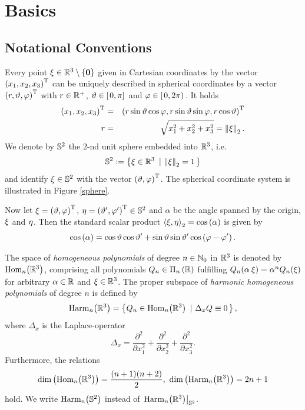 \chapter{Basics}
\label{Basics}

\section{Notational Conventions}
\label{Basics:Notation}

Every point $\mathbf{\xi} \in \mathbb{R}^3 \setminus \left\{\mathbf{0}\right\rbrace$ given in Cartesian coordinates by the vector 
$\left(x_1,x_2,x_3\right)^{\text{\rm{T}}}$ can be uniquely described in spherical coordinates by a vector
$\left(r,\vartheta,\varphi\right)^{\text{\rm{T}}}$ with $r \in \mathbb{R}^{+}$, $\vartheta \in \left[\left.0,\pi\right]\right.$ and 
$\varphi \in \left[\left.0,2\pi\right)\right.$.
It holds 
\begin{eqnarray*}
  \left(x_1,x_2,x_3\right)^{\text{\rm{T}}} & = & \left(r \sin \vartheta \cos \varphi, r \sin \vartheta \sin \varphi, r \cos \vartheta\right)^{\text{\rm{T}}}\\
  r & = & \sqrt{x_1^2+x_2^2+x_3^2} = \left\|\mathbf{\xi}\right\|_2.
\end{eqnarray*} 
We denote by $\mathbb{S}^2$ the $2$-nd unit sphere embedded into $\mathbb{R}^3$, i.e. 
$$\mathbb{S}^2 := \left\{\mathbf{\xi} \in \mathbb{R}^{3}\ \left|\ \left\|\mathbf{\xi}\right\|_2=1\right.\right\rbrace$$ 
and identify $\mathbf{\xi} \in \mathbb{S}^2$ with the vector $\left(\vartheta,\varphi\right)^{\text{\rm{T}}}$. The 
spherical coordinate system is illustrated in Figure \ref{sphere}.

Now let $\mathbf{\xi} = \left(\vartheta,\varphi\right)^{\text{\rm{T}}}$, $\mathbf{\eta} = \left(\vartheta',\varphi'\right)^{\text{\rm{T}}} \in
\mathbb{S}^2$ and $\alpha$ be the angle spanned by the origin, $\mathbf{\xi}$ and $\mathbf{\eta}$.
Then the standard scalar product
$\left<\mathbf{\xi},\mathbf{\eta}\right>_{2} = \cos\left(\alpha\right)$ is given by
\begin{equation}
  \nonumber
  \cos{\hspace{-0.4ex}}\left(\alpha\right) = \cos\vartheta\cos\vartheta' +
  \sin\vartheta\sin\vartheta'\cos{\hspace{-0.4ex}}\left(\varphi-\varphi'\right).
\end{equation}

The space of \emph{homogeneous polynomials} of degree $n \in \mathbb{N}_{0}$ in $\mathbb{R}^3$ is denoted by
$\text{Hom}_n{\hspace{-0.4ex}}\left(\mathbb{R}^3\right)$, comprising all polynomials $Q_n \in \Pi_{n}\left(\mathbb{R}\right)$ fulfilling 
$Q_n{\hspace{-0.4ex}}\left(\alpha\:\mathbf{\xi}\right) = \alpha^n Q_n{\hspace{-0.4ex}}\left(\mathbf{\xi}\right)$ for arbitrary $\alpha \in \mathbb{R}$ and $\mathbf{\xi}
\in \mathbb{R}^3$. The proper subspace of \emph{harmonic homogeneous polynomials} of
degree $n$ is defined by
\begin{equation}
  \nonumber
  \text{Harm}_n{\hspace{-0.4ex}}\left(\mathbb{R}^3\right) = \left\{Q_n \in \text{Hom}_n{\hspace{-0.4ex}}\left(\mathbb{R}^3\right)\ \left|\ \Delta_x Q \equiv 0\right.\right\rbrace,
\end{equation}
where $\Delta_x$ is the Laplace-operator
\begin{equation}
  \nonumber
  \Delta_x = \frac{\partial^2}{\partial x_1^2} + \frac{\partial^2}{\partial x_2^2} +
  \frac{\partial^2}{\partial x_3^2}.
\end{equation}
Furthermore, the relations
\begin{equation}
  \fun{\dim}{\fun{\text{Hom}_n}{\R^3}} = \frac{(n+1)(n+2)}{2},\ 
  \fun{\dim}{\fun{\text{Harm}_n}{\R^3}} = 2n+1
\end{equation}
hold. We write $\text{Harm}_n{\hspace{-0.4ex}}\left(\mathbb{S}^2\right)$ instead of 
$\left.\text{Harm}_n{\hspace{-0.4ex}}\left(\mathbb{R}^3\right)\right|_{\mathbb{S}^2}$.

